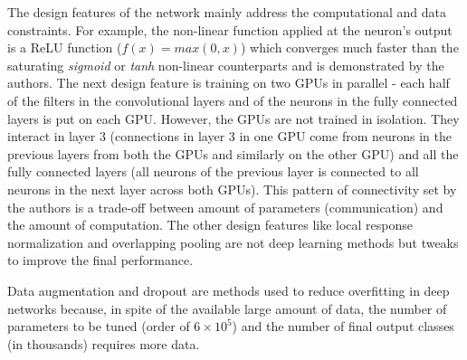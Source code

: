 \documentclass[10pt]{article}
\begin{document}
\par The design features of the network mainly address the computational and data constraints. For example, the non-linear function applied at the neuron's output is a ReLU function ($f(x) = max(0, x)$) which converges much faster than the saturating \textit{sigmoid} or \textit{tanh} non-linear counterparts and is demonstrated by the authors. The next design feature is training on two GPUs in parallel - each half of the filters in the convolutional layers and of the neurons in the fully connected layers is put on each GPU. However, the GPUs are not trained in isolation. They interact in layer 3 (connections in layer 3 in one GPU come from neurons in the previous layers from both the GPUs and similarly on the other GPU) and all the fully connected layers (all neurons of the previous layer is connected to all neurons in the next layer across both GPUs). This pattern of connectivity set by the authors is a trade-off between amount of parameters (communication) and the amount of computation. The other design features like local response normalization and overlapping pooling are not deep learning methods but tweaks to improve the final performance.
\par Data augmentation and dropout are methods used to reduce overfitting in deep networks because, in spite of the available large amount of data, the number of parameters to be tuned (order of $6\times 10^{5}$) and the number of final output classes (in thousands) requires more data.

\end{document}
